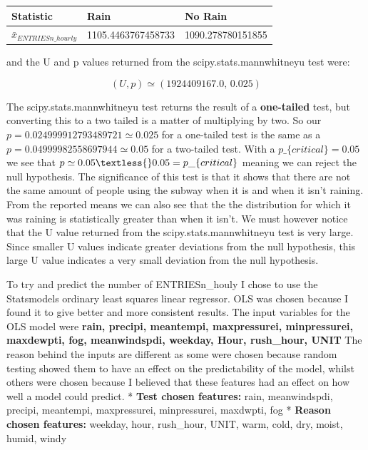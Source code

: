 \documentclass{article}
\begin{document}
\begin{longtable}[c]{@{}lll@{}}
\toprule
Statistic & Rain & No Rain\tabularnewline
\midrule
\endhead
\(\bar{x}_{ENTRIESn\_hourly}\) & 1105.4463767458733 &
1090.278780151855\tabularnewline
\bottomrule
\end{longtable}

and the U and p values returned from the scipy.stats.mannwhitneyu test
were:

\[ (U, p) \simeq (1924409167.0,\, 0.025) \]

    The scipy.stats.mannwhitneyu test returns the result of a
\textbf{one-tailed} test, but converting this to a two tailed is a
matter of multiplying by two. So our $ p = 0.024999912793489721
\simeq 0.025 $ for a one-tailed test is the same as a $ p =
0.04999982558697944 \simeq 0.05 $ for a two-tailed test. With a $
p\_\{critical\} = 0.05 $ we see that $ p \simeq 0.05 \textless{} 0.05
= p\_\{critical\} $ meaning we can reject the null hypothesis. The
significance of this test is that it shows that there are not the same
amount of people using the subway when it is and when it isn't raining.
From the reported means we can also see that the the distribution for
which it was raining is statistically greater than when it isn't. We
must however notice that the U value returned from the
scipy.stats.mannwhitneyu test is very large. Since smaller U values
indicate greater deviations from the null hypothesis, this large U value
indicates a very small deviation from the null hypothesis.

To try and predict the number of ENTRIESn\_houly I chose to use the
Statsmodels ordinary least squares linear regressor. OLS was chosen
because I found it to give better and more consistent results. The input
variables for the OLS model were \textbf{rain, precipi, meantempi,
maxpressurei, minpressurei, maxdewpti, fog, meanwindspdi, weekday, Hour,
rush\_hour, UNIT} The reason behind the inputs are different as some
were chosen because random testing showed them to have an effect on the
predictability of the model, whilst others were chosen because I
believed that these features had an effect on how well a model could
predict. * \textbf{Test chosen features:} rain, meanwindspdi, precipi,
meantempi, maxpressurei, minpressurei, maxdwpti, fog * \textbf{Reason
chosen features:} weekday, hour, rush\_hour, UNIT, warm, cold, dry,
moist, humid, windy
\end{document}
